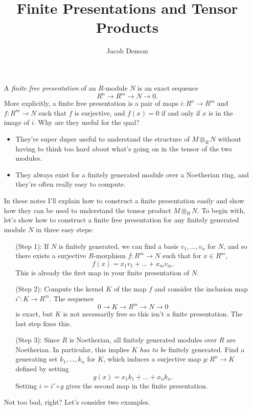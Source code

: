 \documentclass{article}
\title{Finite Presentations and Tensor Products}
\author{Jacob Denson}
\theoremstyle{plain}
\theoremstyle{remark}
\theoremstyle{definition}
\begin{document}
\maketitle

A \emph{finite free presentation} of an $R$-module $N$ is an exact sequence
%
\[ R^n \to R^m \to N \to 0. \]
%
More explicitly, a finite free presentation is a pair of maps $i: R^n \to R^m$ and $f: R^m \to N$ such that $f$ is surjective, and $f(x) = 0$ if and only if $x$ is in the image of $i$. Why are they useful for the qual?
%
\begin{itemize}
	\item They're super duper useful to understand the structure of $M \otimes_R N$ without having to think too hard about what's going on in the tensor of the two modules.
	\item They always exist for a finitely generated module over a Noetherian ring, and they're often really easy to compute.
\end{itemize}
%
In these notes I'll explain how to construct a finite presentation easily and show how they can be used to understand the tensor product $M \otimes_R N$. To begin with, let's show how to construct a finite free presentation for any finitely generated module $N$ in three easy steps:
%
\begin{itemize}
	\item[(Step 1):] If $N$ is finitely generated, we can find a basis $v_1,\dots,v_n$ for $N$, and so there exists a surjective $R$-morphism $f: R^m \to N$ such that for $x \in R^m$,
	\[ f(x) = x_1v_1 + \dots + x_mv_m. \]
	This is already the first map in your finite presentation of $N$.

	\item[(Step 2):] Compute the kernel $K$ of the map $f$ and consider the inclusion map $i': K \to R^m$. The sequence
	\[ 0 \to K \to R^m \to N \to 0 \]
	is exact, but $K$ is not necessarily free so this isn't a finite presentation. The last step fixes this.

	\item[(Step 3):] Since $R$ is Noetherian, all finitely generated modules over $R$ are Noetherian. In particular, this implies $K$ \emph{has to be} finitely generated. Find a generating set $k_1, \dots, k_n$ for $K$, which induces a surjective map $g: R^n \to K$ defined by setting
	\[ g(x) = x_1k_1 + \dots + x_nk_n. \]
	Setting $i = i' \circ g$ gives the second map in the finite presentation.
\end{itemize}
%
Not too bad, right? Let's consider two examples.
\end{document}
